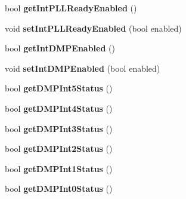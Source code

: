 \begin{DoxyCompactItemize}
\item 
\hypertarget{class_m_p_u6050_a4d02c38682aa566b6204df3f81fbcb68}{bool {\bfseries get\+Int\+P\+L\+L\+Ready\+Enabled} ()}\label{class_m_p_u6050_a4d02c38682aa566b6204df3f81fbcb68}

\item 
\hypertarget{class_m_p_u6050_aef44106927c1b986588f36bffaebea54}{void {\bfseries set\+Int\+P\+L\+L\+Ready\+Enabled} (bool enabled)}\label{class_m_p_u6050_aef44106927c1b986588f36bffaebea54}

\item 
\hypertarget{class_m_p_u6050_a3af3f3c0a16b5b68cf6301cb0ac3f392}{bool {\bfseries get\+Int\+D\+M\+P\+Enabled} ()}\label{class_m_p_u6050_a3af3f3c0a16b5b68cf6301cb0ac3f392}

\item 
\hypertarget{class_m_p_u6050_a889d29900cb0dd16e0199c13822f0f88}{void {\bfseries set\+Int\+D\+M\+P\+Enabled} (bool enabled)}\label{class_m_p_u6050_a889d29900cb0dd16e0199c13822f0f88}

\item 
\hypertarget{class_m_p_u6050_a3a86756b7fe164e454f4801c30cdbffe}{bool {\bfseries get\+D\+M\+P\+Int5\+Status} ()}\label{class_m_p_u6050_a3a86756b7fe164e454f4801c30cdbffe}

\item 
\hypertarget{class_m_p_u6050_a9d406fd5027e7a6b0e33f5bfafc67627}{bool {\bfseries get\+D\+M\+P\+Int4\+Status} ()}\label{class_m_p_u6050_a9d406fd5027e7a6b0e33f5bfafc67627}

\item 
\hypertarget{class_m_p_u6050_a1ac1a70c4d207c93359b43e743d34839}{bool {\bfseries get\+D\+M\+P\+Int3\+Status} ()}\label{class_m_p_u6050_a1ac1a70c4d207c93359b43e743d34839}

\item 
\hypertarget{class_m_p_u6050_acaf41d1789aa02814af0319f71c57a9f}{bool {\bfseries get\+D\+M\+P\+Int2\+Status} ()}\label{class_m_p_u6050_acaf41d1789aa02814af0319f71c57a9f}

\item 
\hypertarget{class_m_p_u6050_a82a5a98ad80c69209ef0f423287b2f76}{bool {\bfseries get\+D\+M\+P\+Int1\+Status} ()}\label{class_m_p_u6050_a82a5a98ad80c69209ef0f423287b2f76}

\item 
\hypertarget{class_m_p_u6050_a2b597f3f6b4188cbdb3feb2cd8dd3469}{bool {\bfseries get\+D\+M\+P\+Int0\+Status} ()}\label{class_m_p_u6050_a2b597f3f6b4188cbdb3feb2cd8dd3469}


\end{DoxyCompactItemize}
